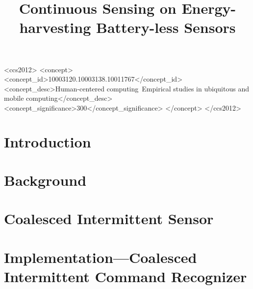 \documentclass[sigconf, anonymous]{acmart}
\begin{document}
\title{Continuous Sensing on Energy-harvesting Battery-less Sensors}


\renewcommand{\shortauthors}{A. Majid et al.}


\begin{abstract}

\end{abstract}

\begin{CCSXML}
<ccs2012>
<concept>
<concept_id>10003120.10003138.10011767</concept_id>
<concept_desc>Human-centered computing~Empirical studies in ubiquitous and mobile computing</concept_desc>
<concept_significance>300</concept_significance>
</concept>
</ccs2012>
\end{CCSXML}


\maketitle


\section{Introduction}
\label{sec:introduction}


\section{Background}
\label{sec:background}


\section{Coalesced Intermittent Sensor}
\label{sec:coalInterSen}


\section{Implementation---Coalesced Intermittent Command Recognizer}
\label{sec:disMic}

\end{document}
